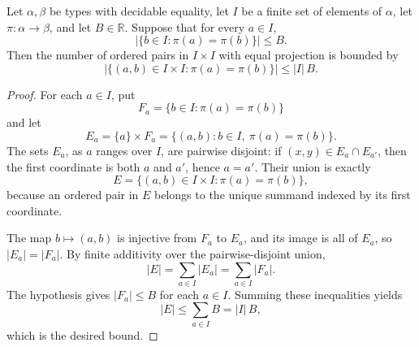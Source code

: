 \begin{helper}
Let \(\alpha,\beta\) be types with decidable equality, let \(I\) be a finite
set of elements of \(\alpha\), let \(\pi:\alpha\to\beta\), and let
\(B\in\mathbb R\).  Suppose that for every \(a\in I\),
\[
\left|\{b\in I:\pi(a)=\pi(b)\}\right|\le B .
\]
Then the number of ordered pairs in \(I\times I\) with equal projection is
bounded by
\[
\left|\{(a,b)\in I\times I:\pi(a)=\pi(b)\}\right|
   \le |I|\,B .
\]
\end{helper}
\begin{proof}
For each \(a\in I\), put
\[
F_a=\{b\in I:\pi(a)=\pi(b)\}
\]
and let
\[
E_a=\{a\}\times F_a
  =\{(a,b):b\in I,\ \pi(a)=\pi(b)\}.
\]
The sets \(E_a\), as \(a\) ranges over \(I\), are pairwise disjoint: if
\((x,y)\in E_a\cap E_{a'}\), then the first coordinate is both \(a\) and
\(a'\), hence \(a=a'\).  Their union is exactly
\[
E=\{(a,b)\in I\times I:\pi(a)=\pi(b)\},
\]
because an ordered pair in \(E\) belongs to the unique summand indexed by its
first coordinate.

The map \(b\mapsto(a,b)\) is injective from \(F_a\) to \(E_a\), and its image
is all of \(E_a\), so \(|E_a|=|F_a|\).  By finite additivity over the
pairwise-disjoint union,
\[
|E|=\sum_{a\in I}|E_a|
    =\sum_{a\in I}|F_a|.
\]
The hypothesis gives \(|F_a|\le B\) for each \(a\in I\).  Summing these
inequalities yields
\[
|E|\le\sum_{a\in I}B=|I|\,B,
\]
which is the desired bound.
\end{proof}
